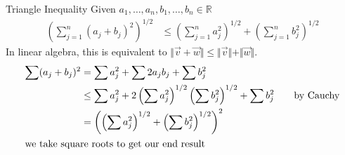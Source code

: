 \documentclass[8pt]{extarticle}
\newcommand{\R}{\mathbb{R}}
\begin{document}
  \begin{problem}{Triangle Inequality}
    Given $a_1,\dots,a_n,b_1,\dots,b_n\in\R$
    \begin{align*}
      \left(\sum_{j=1}^{n}(a_j + b_j)^2\right)^{1/2} &\leq \left(\sum_{j=1}^{n}a_j^2\right)^{1/2} + \left(\sum_{j=1}^{n}b_j^2\right)^{1/2}
    \end{align*}
    In linear algebra, this is equivalent to $\Vert\vec{v} + \vec{w}\Vert \leq \Vert\vec{v}\Vert + \Vert\vec{w}\Vert$.
    \tcblower
    \begin{align*}
      \sum (a_j + b_j)^2 &= \sum a_j^2 + \sum 2a_jb_j + \sum b_j^2\\
                         &\leq \sum a_j^2 + 2\left(\sum a_j^2\right)^{1/2}\left(\sum b_j^2\right)^{1/2} + \sum b_j^2\tag*{by Cauchy}\\
                         &= \left(\left(\sum a_j^2\right)^{1/2} + \left(\sum b_j^2\right)^{1/2} \right)^2\\
                         \shortintertext{we take square roots to get our end result}
    \end{align*}
  \end{problem}
\end{document}
